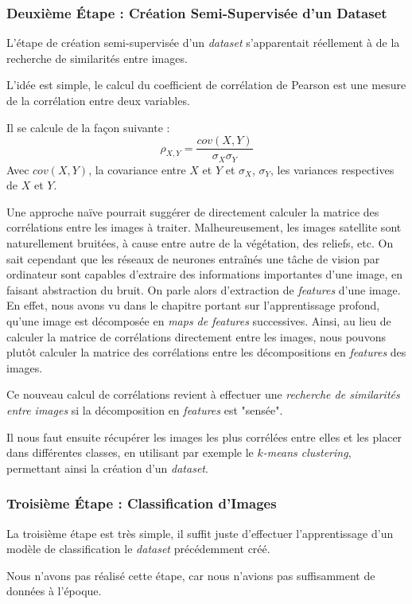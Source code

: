 \documentclass[a4paper, 11pt]{report}
\begin{document}
\subsubsection{Deuxième Étape : Création Semi-Supervisée d'un Dataset}
L'étape de création semi-supervisée d'un \emph{dataset} s'apparentait réellement à de la recherche de similarités entre images.

L'idée est simple, le calcul du coefficient de corrélation de Pearson  est une mesure de la corrélation entre deux variables.

Il se calcule de la façon suivante :
$$\rho_{X,Y} = \frac{cov(X,Y)}{\sigma_X \sigma_Y}$$
Avec $cov(X,Y)$, la covariance entre $X$ et $Y$ et $\sigma_X$, $\sigma_Y$, les variances respectives de $X$ et $Y$.

Une approche naïve pourrait suggérer de directement calculer la matrice des corrélations entre les images à traiter. Malheureusement, les images satellite sont naturellement bruitées, à cause entre autre de la végétation, des reliefs, etc.
On sait cependant que les réseaux de neurones entraînés une tâche de vision par ordinateur sont capables d'extraire des informations importantes d'une image, en faisant abstraction du bruit.
On parle alors d'extraction de \emph{features} d'une image.
En effet, nous avons vu dans le chapitre portant sur l'apprentissage profond, qu'une image est décomposée en \emph{maps de features} successives.
Ainsi, au lieu de calculer la matrice de corrélations directement entre les images, nous pouvons plutôt calculer la matrice des corrélations entre les décompositions en \emph{features} des images.

Ce nouveau calcul de corrélations revient à effectuer une \emph{recherche de similarités entre images} si la décomposition en \emph{features} est "sensée".


Il nous faut ensuite récupérer les images les plus corrélées entre elles et les placer dans différentes classes, en utilisant par exemple le $k$\emph{-means clustering}, permettant ainsi la création d'un \emph{dataset}.

\subsubsection{Troisième Étape : Classification d'Images}

La troisième étape est très simple, il suffit juste d'effectuer l'apprentissage d'un modèle de classification le \emph{dataset} précédemment créé.

Nous n'avons pas réalisé cette étape, car nous n'avions pas suffisamment de données à l'époque.
\end{document}
